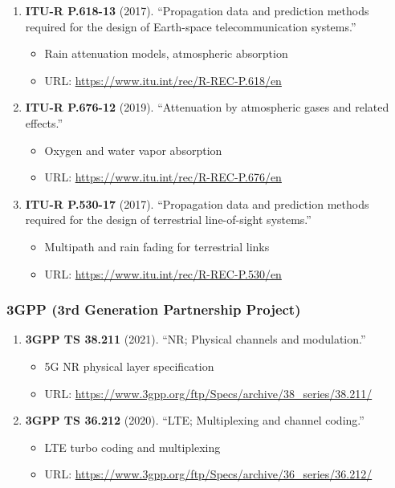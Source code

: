 \begin{enumerate}
\def\labelenumi{\arabic{enumi}.}
\setcounter{enumi}{25}
\tightlist
\item
  \textbf{ITU-R P.618-13} (2017). ``Propagation data and prediction
  methods required for the design of Earth-space telecommunication
  systems.''

  \begin{itemize}
  \tightlist
  \item
    Rain attenuation models, atmospheric absorption
  \item
    URL: \url{https://www.itu.int/rec/R-REC-P.618/en}
  \end{itemize}
\item
  \textbf{ITU-R P.676-12} (2019). ``Attenuation by atmospheric gases and
  related effects.''

  \begin{itemize}
  \tightlist
  \item
    Oxygen and water vapor absorption
  \item
    URL: \url{https://www.itu.int/rec/R-REC-P.676/en}
  \end{itemize}
\item
  \textbf{ITU-R P.530-17} (2017). ``Propagation data and prediction
  methods required for the design of terrestrial line-of-sight
  systems.''

  \begin{itemize}
  \tightlist
  \item
    Multipath and rain fading for terrestrial links
  \item
    URL: \url{https://www.itu.int/rec/R-REC-P.530/en}
  \end{itemize}
\end{enumerate}

\subsubsection{3GPP (3rd Generation Partnership
Project)}\label{gpp-3rd-generation-partnership-project}

\begin{enumerate}
\def\labelenumi{\arabic{enumi}.}
\setcounter{enumi}{28}
\tightlist
\item
  \textbf{3GPP TS 38.211} (2021). ``NR; Physical channels and
  modulation.''

  \begin{itemize}
  \tightlist
  \item
    5G NR physical layer specification
  \item
    URL: \url{https://www.3gpp.org/ftp/Specs/archive/38_series/38.211/}
  \end{itemize}
\item
  \textbf{3GPP TS 36.212} (2020). ``LTE; Multiplexing and channel
  coding.''

  \begin{itemize}
  \tightlist
  \item
    LTE turbo coding and multiplexing
  \item
    URL: \url{https://www.3gpp.org/ftp/Specs/archive/36_series/36.212/}
  \end{itemize}
\end{enumerate}

